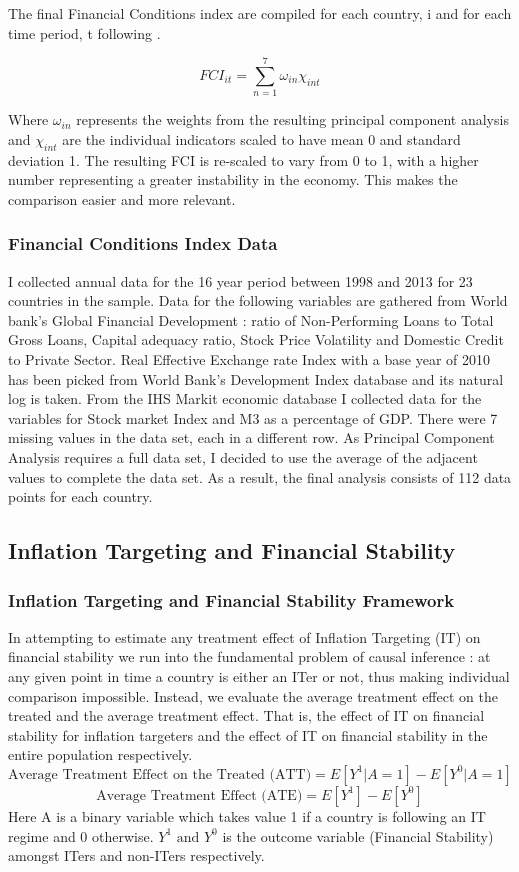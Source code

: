 \documentclass[12pt]{article}
\begin{document}
The final Financial Conditions index are compiled for each country, i and for each time period, t following  \cite{RN4}.

\[FCI_{it} = \sum_{n=1}^{7} \omega_{in}\chi_{int} \]

Where $\omega_{in}$ represents the weights from the resulting principal component analysis and $\chi_{int}$ are the individual indicators scaled to have mean 0 and standard deviation 1. The resulting FCI is re-scaled to vary from 0 to 1, with a higher number representing a greater instability in the economy.  This makes the comparison easier and more relevant.

\subsubsection{Financial Conditions Index Data}

I collected annual data for the 16 year period between 1998 and 2013 for 23 countries in the sample.  Data for the following variables are gathered from World bank's Global Financial Development : ratio of Non-Performing Loans to Total Gross Loans, Capital adequacy ratio, Stock Price Volatility and Domestic Credit to Private Sector.  Real Effective Exchange rate Index with a base year of 2010 has been picked from World Bank's Development Index database and its natural log is taken. From the IHS Markit economic database I collected data for the variables for Stock market Index and M3 as a percentage of GDP.  
There were 7 missing values in the data set,  each in a different row. As Principal Component Analysis requires a full data set, I decided to use the average of the adjacent values to complete the data set. As a result, the final analysis consists of 112 data points for each country.


\subsection{Inflation Targeting and Financial Stability}

\subsubsection{Inflation Targeting and Financial Stability Framework}

In attempting to estimate any treatment effect of Inflation Targeting (IT) on financial stability we run into the fundamental problem of causal inference : at any given point in time a country is either an ITer or not, thus making individual comparison impossible. Instead, we evaluate the average treatment effect on the treated and the average treatment effect.   That is, the effect of IT on financial stability for inflation targeters and the effect of IT on financial stability in the entire population respectively.
\[ \text{Average Treatment Effect on the Treated (ATT)} =  E[Y^{1}|A= 1] - E[Y^{0}|A=1]  \]
\[ \text{Average Treatment Effect (ATE)} =  E[Y^{1}] - E[Y^{0}]  \]
Here A is a binary variable which takes value 1 if a country is following an IT regime and 0 otherwise.  $Y^{1} \text{  and   } Y^{0}$ is the outcome variable (Financial Stability) amongst ITers and non-ITers respectively. 
\end{document}
